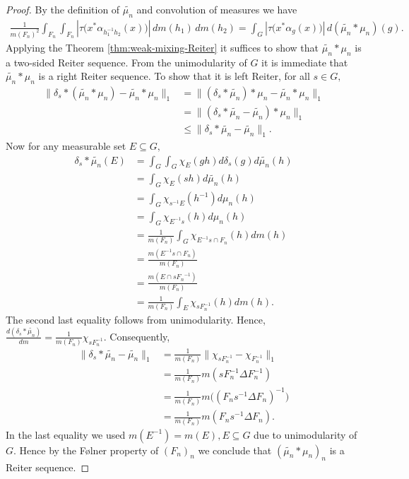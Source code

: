 \documentclass[11pt]{amsart}
\theoremstyle{definition}
\theoremstyle{myremark}
\numberwithin{equation}{section}
\begin{document}
 \begin{proof}
  By the definition of $\widetilde{\mu_n}$ and convolution of measures we have 
     \begin{align}
         \frac{1}{m(F_n)^2}
\int_{F_n}\int_{F_n}
\left|
\tau\bigl(x^*\alpha_{h_1^{-1}h_2}(x)\bigr)
\right|
\,dm(h_1)\,dm(h_2)= 
\int_G
\left|
\tau\bigl(x^*\alpha_{g}(x)\bigr)
\right|
\,d(\widetilde{\mu_n}*\mu_n)(g).
     \end{align}
Applying the Theorem \ref{thm:weak-mixing-Reiter} it suffices to show that $\widetilde{\mu_n}*\mu_n$ is a two-sided Reiter sequence. From the unimodularity of $G$ it is immediate that $\widetilde{\mu_n}*\mu_n$ is a right Reiter sequence. To show that it is left Reiter,
for all $s \in G,$
\begin{align*}
    \|\delta_s*(\widetilde{\mu_n}*\mu_n)-\widetilde{\mu_n}*\mu_n\|_1 &= \|(\delta_s*\widetilde{\mu_n})*\mu_n-\widetilde{\mu_n}*\mu_n\|_1\\ &=\|(\delta_s*\widetilde{\mu_n}-\widetilde{\mu_n})*\mu_n\|_1\\
    &\leq \|\delta_s*\widetilde{\mu_n}-\widetilde{\mu_n}\|_1.
\end{align*}
Now for any measurable set $E\subseteq G,$
\begin{align*}
    \delta_s*\widetilde{\mu_n}(E) &= \int_G\int_G \chi_E(gh)d\delta_s(g)d\widetilde{\mu_n}(h)\\
   &= \int_G\chi_E(sh)d\widetilde{\mu_n}(h)\\
    &=\int_G\chi_{s^{-1}E}(h^{-1})d\mu_n(h)\\
    &=\int_G\chi_{E^{-1}s}(h)d\mu_n(h)\\
    &= \frac{1}{m(F_n)}\int_G\chi_{E^{-1}s \cap F_n}(h)dm(h)\\
    &=\frac{m(E^{-1}s \cap F_n)}{m(F_n)}\\
    &=\frac{m(E \cap s{F_n}^{-1})}{m(F_n)}\\
    &=\frac{1}{m(F_n)}\int_E\chi_{sF_n^{-1}}(h)dm(h).
\end{align*}
The second last equality follows from unimodularity. Hence, $\frac{d(\delta_s*\widetilde{\mu_n})}{dm}=\frac{1}{m(F_n)}\chi_{sF_n^{-1}}.$
Consequently, \begin{align*}
    \|\delta_s*\widetilde{\mu_n}-\widetilde{\mu_n}\|_1 &=\frac{1}{m(F_n)}\|\chi_{sF_n^{-1}}-\chi_{F_n^{-1}}\|_1\\
    &=\frac{1}{m(F_n)}m(sF_n^{-1}\Delta F_n^{-1})\\
    &=\frac{1}{m(F_n)}m\bigl((F_ns^{-1}\Delta F_n)^{-1}\bigr)\\
    &=\frac{1}{m(F_n)}m(F_ns^{-1}\Delta F_n).
\end{align*}
In the last equality we used $m(E^{-1})=m(E), E\subseteq G$ due to unimodularity of $G.$ Hence by the F\o lner property of $(F_n)_n$ we conclude that $(\widetilde{\mu_n}*\mu_n)_n$ is a Reiter sequence.
 \end{proof}
\end{document}
